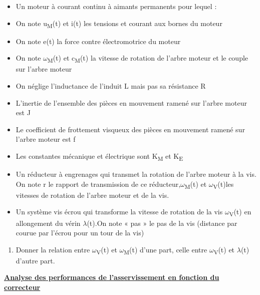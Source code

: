 \begin{itemize}
\item
  Un moteur à courant continu à aimants permanents pour lequel :
\end{itemize}

\begin{itemize}
\item
  On note u\textsubscript{M}(t) et i(t) les tensions et courant aux
  bornes du moteur
\item
  On note e(t) la force contre électromotrice du moteur
\item
  On note $\omega$\textsubscript{M}(t) et c\textsubscript{M}(t) la vitesse de
  rotation de l'arbre moteur et le couple sur l'arbre moteur
\item
  On néglige l'inductance de l'induit L mais pas sa résistance R
\item
  L'inertie de l'ensemble des pièces en mouvement ramené sur l'arbre
  moteur est J
\item
  Le coefficient de frottement visqueux des pièces en mouvement ramené
  sur l'arbre moteur est f
\item
  Les constantes mécanique et électrique sont K\textsubscript{M} et
  K\textsubscript{E}
\end{itemize}

\begin{itemize}
\item
  Un réducteur à engrenages qui transmet la rotation de l'arbre moteur à
  la vis. On note r le rapport de transmission de ce
  réducteur,$\omega$\textsubscript{M}(t) et $\omega$\textsubscript{V}(t)les vitesses
  de rotation de l'arbre moteur et de la vis.
\item
  Un système vis écrou qui transforme la vitesse de rotation de la vis
  $\omega$\textsubscript{V}(t) en allongement du vérin $\lambda$(t).On note « pas » le
  pas de la vis (distance par courue par l'écrou pour un tour de la vis)
\end{itemize}

\begin{enumerate}
\def\labelenumi{\arabic{enumi}.}
\setcounter{enumi}{2}
\item
  Donner la relation entre $\omega$\textsubscript{V}(t) et
  $\omega$\textsubscript{M}(t) d'une part, celle entre $\omega$\textsubscript{V}(t) et
  $\lambda$(t) d'autre part.
\end{enumerate}

\textbf{\ul{Analyse des performances de l'asservissement en fonction du
correcteur}}

